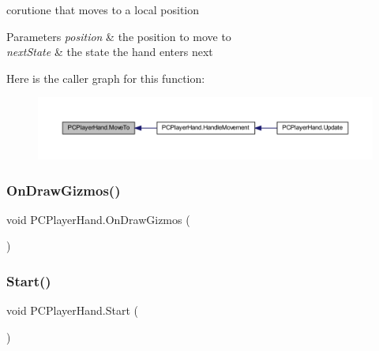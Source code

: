 corutione that moves to a local position 


\begin{DoxyParams}{Parameters}
{\em position} & the position to move to\\
\hline
{\em next\+State} & the state the hand enters next\\
\hline
\end{DoxyParams}
Here is the caller graph for this function\+:
\nopagebreak
\begin{figure}[H]
\begin{center}
\leavevmode
\includegraphics[width=350pt]{class_p_c_player_hand_a338f6e5898a4953d48c046354ffef9e2_icgraph}
\end{center}
\end{figure}
\mbox{\label{class_p_c_player_hand_a40a567183ee039605d5778060e5ce17a}} 
\subsubsection{\texorpdfstring{On\+Draw\+Gizmos()}{OnDrawGizmos()}}
{\footnotesize\ttfamily void P\+C\+Player\+Hand.\+On\+Draw\+Gizmos (\begin{DoxyParamCaption}{ }\end{DoxyParamCaption})\hspace{0.3cm}{\ttfamily [private]}}

\mbox{\label{class_p_c_player_hand_aa3eed40e80c66f9e85905cf2c2c4fcbe}} 
\subsubsection{\texorpdfstring{Start()}{Start()}}
{\footnotesize\ttfamily void P\+C\+Player\+Hand.\+Start (\begin{DoxyParamCaption}{ }\end{DoxyParamCaption})\hspace{0.3cm}{\ttfamily [private]}}


